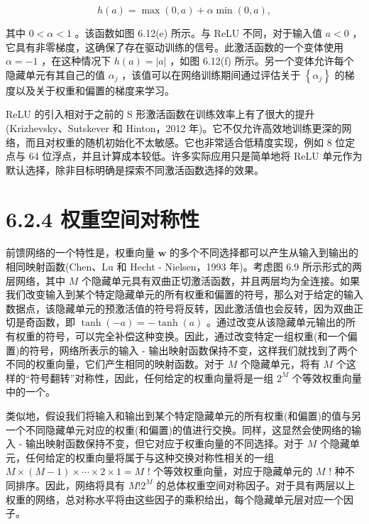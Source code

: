 \documentclass[10pt]{article}
\begin{document}
\[
h\left( a\right)  = \max \left( {0,a}\right)  + \alpha \min \left( {0,a}\right) , \tag{6.18}
\]

其中 \(0 < \alpha  < 1\) 。该函数如图 6.12(e) 所示。与 ReLU 不同，对于输入值 \(a < 0\) ，它具有非零梯度，这确保了存在驱动训练的信号。此激活函数的一个变体使用 \(\alpha  =  - 1\) ，在这种情况下 \(h\left( a\right)  = \left| a\right|\) ，如图 6.12(f) 所示。另一个变体允许每个隐藏单元有其自己的值 \({\alpha }_{j}\) ，该值可以在网络训练期间通过评估关于 \(\left\{  {\alpha }_{j}\right\}\) 的梯度以及关于权重和偏置的梯度来学习。

ReLU 的引入相对于之前的 S 形激活函数在训练效率上有了很大的提升(Krizhevsky、Sutskever 和 Hinton，2012 年)。它不仅允许高效地训练更深的网络，而且对权重的随机初始化不太敏感。它也非常适合低精度实现，例如 8 位定点与 64 位浮点，并且计算成本较低。许多实际应用只是简单地将 ReLU 单元作为默认选择，除非目标明确是探索不同激活函数选择的效果。

\section*{6.2.4 权重空间对称性}

前馈网络的一个特性是，权重向量 \(\mathbf{w}\) 的多个不同选择都可以产生从输入到输出的相同映射函数(Chen、Lu 和 Hecht - Nielsen，1993 年)。考虑图 6.9 所示形式的两层网络，其中 \(M\) 个隐藏单元具有双曲正切激活函数，并且两层均为全连接。如果我们改变输入到某个特定隐藏单元的所有权重和偏置的符号，那么对于给定的输入数据点，该隐藏单元的预激活值的符号将反转，因此激活值也会反转，因为双曲正切是奇函数，即 \(\tanh \left( {-a}\right)  =  - \tanh \left( a\right)\) 。通过改变从该隐藏单元输出的所有权重的符号，可以完全补偿这种变换。因此，通过改变特定一组权重(和一个偏置)的符号，网络所表示的输入 - 输出映射函数保持不变，这样我们就找到了两个不同的权重向量，它们产生相同的映射函数。对于 \(M\) 个隐藏单元，将有 \(M\) 个这样的“符号翻转”对称性，因此，任何给定的权重向量将是一组 \({2}^{M}\) 个等效权重向量中的一个。

类似地，假设我们将输入和输出到某个特定隐藏单元的所有权重(和偏置)的值与另一个不同隐藏单元对应的权重(和偏置)的值进行交换。同样，这显然会使网络的输入 - 输出映射函数保持不变，但它对应于权重向量的不同选择。对于 \(M\) 个隐藏单元，任何给定的权重向量将属于与这种交换对称性相关的一组 \(M \times  \left( {M - 1}\right)  \times  \cdots  \times  2 \times  1 = M\) ! 个等效权重向量，对应于隐藏单元的 \(M\) ! 种不同排序。因此，网络将具有 \(M!{2}^{M}\) 的总体权重空间对称因子。对于具有两层以上权重的网络，总对称水平将由这些因子的乘积给出，每个隐藏单元层对应一个因子。
\end{document}
